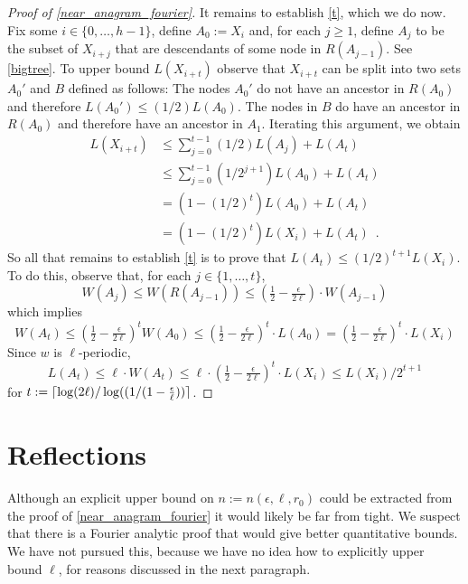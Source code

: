 \documentclass{patmorin}
\begin{document}
\begin{proof}[Proof of \cref{near_anagram_fourier}]
  It remains to establish \cref{t}, which we do now.  Fix some $i\in\{0,\ldots,h-1\}$, define $A_0:= X_i$ and, for each $j\ge 1$, define $A_j$ to be the subset of $X_{i+j}$ that are descendants of some node in $R(A_{j-1})$.  See \cref{bigtree}.  To upper bound $L(X_{i+t})$ observe that $X_{i+t}$ can be split into two sets $A_0'$ and $B$ defined as follows:  The nodes $A_0'$ do not have an ancestor in $R(A_0)$ and therefore $L(A_0')\le (1/2)L(A_0)$. The nodes in $B$ do have an ancestor in $R(A_0)$ and therefore have an ancestor in $A_1$.  Iterating this argument, we obtain
 \begin{align*}
      L(X_{i+t})
         &\le \sum_{j=0}^{t-1}(1/2)L(A_j) + L(A_t) \\
         &\le \sum_{j=0}^{t-1}(1/2^{j+1})L(A_0) + L(A_t) \\
         &  = (1-(1/2)^t)L(A_0) + L(A_t) \\
         & = (1-(1/2)^t)L(X_i) + L(A_t)  \enspace .
   \end{align*}
  So all that remains to establish \ref{t} is to prove that
  $L(A_t)\le (1/2)^{t+1}L(X_i)$.  To do this, observe that, for each $j\in\{1,\ldots,t\}$,
  \begin{equation}
      W(A_j)
        \le W(R(A_{j-1}))
        \le (\tfrac12-\tfrac{\epsilon}{2\ell})\cdot W(A_{j-1})
  \end{equation}
  which implies
  \[
       W(A_t)
       \le (\tfrac12-\tfrac{\epsilon}{2\ell})^t W(A_0) \le (\tfrac12-\tfrac{\epsilon}{2\ell})^t\cdot L(A_0)
       =  (\tfrac12-\tfrac{\epsilon}{2\ell})^t\cdot L(X_i)
  \]
  Since $w$ is $\ell$-periodic,
  \[
        L(A_t)\le \ell\cdot W(A_t) \le \ell\cdot(\tfrac12-\tfrac{\epsilon}{2\ell})^t\cdot L(X_i) \le L(X_i)/2^{t+1}
  \]
  for $t := {\lceil \log(2\ell)/\log((1/(1-\tfrac{\epsilon}{\ell})) \rceil}$.
\end{proof}

\section{Reflections}
\label{reflections}

Although an explicit upper bound on $n:=n(\epsilon,\ell,r_0)$ could be extracted from the proof of \cref{near_anagram_fourier} it would likely be far from tight.  We suspect that there is a Fourier analytic proof that would give better quantitative bounds.  We have not pursued this, because we have no idea how to explicitly upper bound $\ell$, for reasons discussed in the next paragraph.
\end{document}
